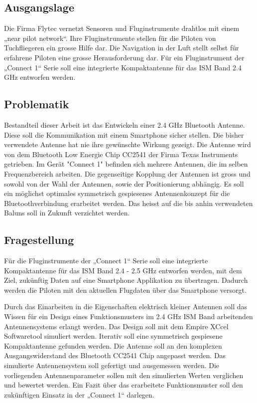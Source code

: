 \subsection{Ausgangslage}
Die Firma Flytec vernetzt Sensoren und Fluginstrumente drahtlos mit einem  „near pilot network“. Ihre Fluginstrumente stellen für die Piloten von Tuchfliegeren ein grosse Hilfe dar. Die Navigation in der Luft stellt selbst für erfahrene Piloten eine grosse Herausforderung dar. Für ein Fluginstrument der „Connect 1“ Serie  soll eine integrierte Kompaktantenne für das ISM Band 2.4 GHz entworfen werden. 

\subsection{Problematik}
Bestandteil dieser Arbeit ist das Entwickeln einer 2.4 GHz Bluetooth Antenne. Diese soll die Kommunikation mit einem Smartphone sicher stellen. Die bisher verwendete Antenne hat nie ihre gewünschte Wirkung gezeigt. Die Antenne wird von dem Bluetooth Low Energie Chip CC2541 der Firma Texas Instruments getrieben. Im Gerät "Connect 1" befinden sich mehrere Antennen, die im selben Frequenzbereich arbeiten. Die gegenseitige Kopplung der Antennen ist gross und sowohl  von der Wahl der Antennen, sowie der Positionierung abhängig. Es soll ein möglichst optimales symmetrisch gespiesenes Antennenkonzept für die Bluetoothverbindung erarbeitet werden. Das heisst auf die bis anhin verwendeten Baluns soll in Zukunft verzichtet werden.
\subsection{Fragestellung}
Für die Fluginstrumente der „Connect 1“ Serie  soll eine integrierte Kompaktantenne für das ISM Band 2.4 - 2.5 GHz entworfen werden, mit dem Ziel, zukünftig Daten auf eine Smartphone Applikation zu übertragen. Dadurch werden die Piloten mit den aktuellen Flugdaten über das Smartphone  versorgt. 

Durch das Einarbeiten in die Eigenschaften elektrisch kleiner Antennen soll das Wissen für ein Design eines Funktionsmusters  im 2.4 GHz ISM Band arbeitenden Antennensystems erlangt werden. Das Design soll mit dem Empire XCcel Softwaretool simuliert werden. Iterativ soll eine symmetrisch gespiesene Kompaktantenne gefunden werden. Die Antenne soll an den komplexen Ausgangswiderstand des Bluetooth CC2541 Chip angepasst werden. Das simulierte Antennensystem soll gefertigt und ausgemessen werden. Die vorliegenden Antennenparameter sollen mit den simulierten Werten verglichen und bewertet werden. Ein Fazit über das erarbeitete Funktionsmuster soll den zukünftigen Einsatz in der „Connect 1“ darlegen.
